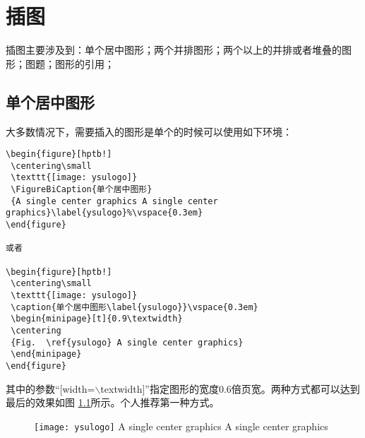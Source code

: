 \chapter{插图}
\label{chap:figures}

插图主要涉及到：单个居中图形；两个并排图形；两个以上的并排或者堆叠的图形；图题；图形的引用；

\section{单个居中图形}\label{section2-1}

大多数情况下，需要插入的图形是单个的时候可以使用如下环境：

\begin{verbatim}
\begin{figure}[hptb!]
 \centering\small
 \texttt{[image: ysulogo]}
 \FigureBiCaption{单个居中图形}
 {A single center graphics A single center graphics}\label{ysulogo}%\vspace{0.3em}
\end{figure}

或者

\begin{figure}[hptb!]
 \centering\small
 \texttt{[image: ysulogo]}
 \caption{单个居中图形\label{ysulogo}}\vspace{0.3em}
 \begin{minipage}[t]{0.9\textwidth}
 \centering
 {Fig.  \ref{ysulogo} A single center graphics}
 \end{minipage}
\end{figure}
\end{verbatim}
其中的参数“[width=$\backslash$textwidth]”指定图形的宽度0.6倍页宽。两种方式都可以达到最后的效果如图 \ref{ysulogo}所示。个人推荐第一种方式。
\begin{figure}[hptb!]
 \centering\small
 \texttt{[image: ysulogo]}
 {A single center graphics A single center graphics }\label{ysulogo} 
\end{figure}



